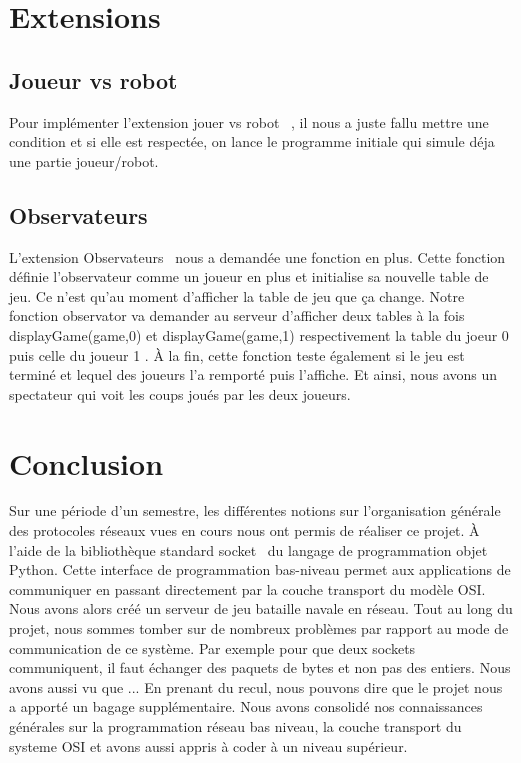 \documentclass{article}
\begin{document}
\section{Extensions}
	\subsection{Joueur vs robot}
	Pour impl\'ementer l\textquoteright extension \guillemotleft jouer vs robot \guillemotright \ , il nous a juste fallu mettre une condition et si elle est respect\'ee, on lance le programme initiale qui simule d\'eja une partie joueur/robot. 
	
	\subsection{Observateurs}
	L'extension \guillemotleft Observateurs \guillemotright \ nous a demand\'ee une fonction en plus. Cette fonction d\'efinie l'observateur comme un joueur en plus et initialise sa nouvelle table de jeu. Ce n'est qu'au moment d'afficher la table de jeu que \c ca change. Notre fonction \guillemotleft observator \guillemotright va demander au serveur d'afficher deux tables \`a la fois \guillemotleft displayGame(game,0) \guillemotright et \guillemotleft displayGame(game,1) \guillemotright respectivement la table du joeur 0 puis celle du joueur 1 . \`A la fin, cette fonction teste \'egalement si le jeu est termin\'e et lequel des joueurs l'a remport\'e puis l'affiche. Et ainsi, nous avons un spectateur qui voit les coups jou\'es par les deux joueurs.


\section{Conclusion}
Sur une p\'eriode d'un semestre, les diff\'erentes notions sur l'organisation g\'en\'erale des protocoles r\'eseaux vues en cours nous ont permis de r\'ealiser ce projet. \`A l'aide de la biblioth\`eque standard \guillemotleft socket \guillemotright \ du langage de programmation objet Python. Cette interface de programmation bas-niveau permet aux applications de communiquer en passant directement par la couche transport du mod\`ele OSI. Nous avons alors cr\'e\'e un serveur de jeu bataille navale en r\'eseau.
\newline Tout au long du projet, nous sommes tomber sur de nombreux probl\`emes par rapport au mode de communication de ce syst\`eme. Par exemple pour que deux sockets communiquent, il faut \'echanger des paquets de bytes et non pas des entiers. Nous avons aussi vu que ...
\newline En prenant du recul, nous pouvons dire que le projet nous a apport\'e un bagage suppl\'ementaire. Nous avons consolid\'e nos connaissances g\'en\'erales sur la programmation r\'eseau bas niveau, la couche transport du systeme OSI et avons aussi appris \`a coder \`a un niveau sup\'erieur.
\end{document}
